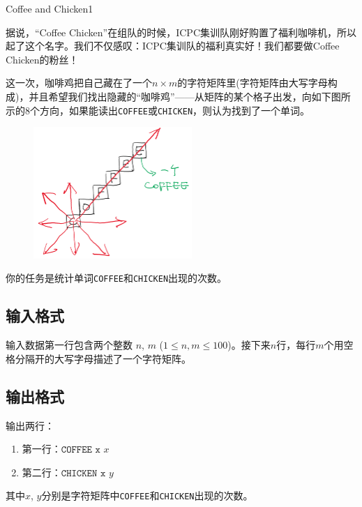 \begin{Problem}{Coffee and Chicken}{1}

据说，“Coffee Chicken”在组队的时候，ICPC集训队刚好购置了福利咖啡机，所以起了这个名字。我们不仅感叹：ICPC集训队的福利真实好！我们都要做Coffee Chicken的粉丝！

这一次，咖啡鸡把自己藏在了一个$n\times m$的字符矩阵里(字符矩阵由大写字母构成)，并且希望我们找出隐藏的“咖啡鸡”——从矩阵的某个格子出发，向如下图所示的8个方向，如果能读出\texttt{COFFEE}或\texttt{CHICKEN}，则认为找到了一个单词。

\begin{figure}[h]
  \center
  \includegraphics[width=6cm]{src/coffeechicken/coffeechicken.png}
\end{figure}

你的任务是统计单词\texttt{COFFEE}和\texttt{CHICKEN}出现的次数。

\subsection*{输入格式}

输入数据第一行包含两个整数 $n$, $m$ ($1\le n,m\le 100$)。接下来$n$行，每行$m$个用空格分隔开的大写字母描述了一个字符矩阵。

\subsection*{输出格式}

输出两行：

\begin{enumerate}
\item 第一行：$\texttt{COFFEE x $x$}$
\item 第二行：$\texttt{CHICKEN x $y$}$
\end{enumerate}

其中$x$, $y$分别是字符矩阵中\texttt{COFFEE}和\texttt{CHICKEN}出现的次数。


\end{Problem}
